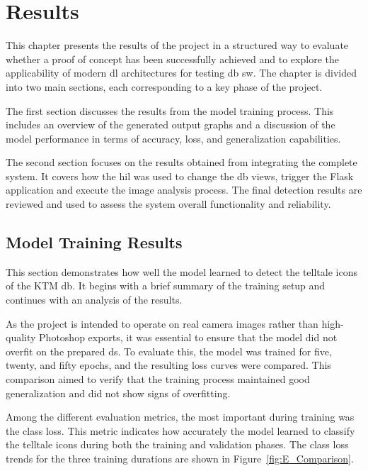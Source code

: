 \chapter{Results}

This chapter presents the results of the project in a structured way to evaluate whether a proof of concept has been successfully achieved and to explore the applicability of modern \gls{dl} architectures for testing \gls{db} \gls{sw}. The chapter is divided into two main sections, each corresponding to a key phase of the project.

The first section discusses the results from the model training process. This includes an overview of the generated output graphs and a discussion of the model performance in terms of accuracy, loss, and generalization capabilities.

The second section focuses on the results obtained from integrating the complete system. It covers how the \gls{hil} was used to change the \gls{db} views, trigger the Flask application and execute the image analysis process. The final detection results are reviewed and used to assess the system overall functionality and reliability.

\section{Model Training Results}
This section demonstrates how well the model learned to detect the telltale icons of the KTM \gls{db}. It begins with a brief summary of the training setup and continues with an analysis of the results.

As the project is intended to operate on real camera images rather than high-quality Photoshop exports, it was essential to ensure that the model did not overfit on the prepared \gls{ds}. To evaluate this, the model was trained for five, twenty, and fifty epochs, and the resulting loss curves were compared. This comparison aimed to verify that the training process maintained good generalization and did not show signs of overfitting.

Among the different evaluation metrics, the most important during training was the class loss. This metric indicates how accurately the model learned to classify the telltale icons during both the training and validation phases. The class loss trends for the three training durations are shown in Figure~\ref{fig:E_Comparison}.

